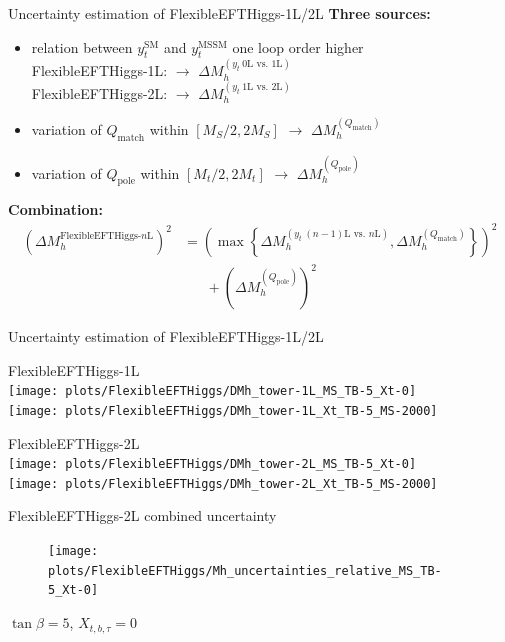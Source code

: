 \documentclass[hyperref={pdfpagelabels=false},ngerman]{beamer}
\renewcommand{\emph}{\textbf}
\newcommand{\pole}{\ensuremath{\text{pole}}}
\begin{document}
\begin{frame}{Uncertainty estimation of FlexibleEFTHiggs-1L/2L}
  \emph{Three sources:}
  \begin{itemize}
  \item relation between $y_t^{\text{SM}}$ and $y_t^{\text{MSSM}}$ one loop order higher \\
    FlexibleEFTHiggs-1L: $\rightarrow$ $\Delta M_h^{(y_t\ \text{0L vs. 1L})}$\\
    FlexibleEFTHiggs-2L: $\rightarrow$ $\Delta M_h^{(y_t\ \text{1L vs. 2L})}$
  \item variation of $Q_\text{match}$ within $[M_S/2, 2 M_S]$
    $\rightarrow$ $\Delta M_h^{(Q_\text{match})}$
  \item variation of $Q_\text{pole}$ within $[M_t/2, 2 M_t]$
    $\rightarrow$ $\Delta M_h^{(Q_\pole)}$
  \end{itemize}
  \emph{Combination:}
  \begin{align*}
    \left(\Delta M_h^{\text{FlexibleEFTHiggs-$n$L}}\right)^2
    &= \left(\max\left\{
        \Delta M_h^{(y_t\ \text{$(n-1)$L vs. $n$L})},
        \Delta M_h^{(Q_\text{match})}\right\}\right)^2 \\
    &\phantom{=\;} + \left(\Delta M_h^{(Q_\pole)}\right)^2
  \end{align*}
\end{frame}

\begin{frame}{Uncertainty estimation of FlexibleEFTHiggs-1L/2L}
  \begin{minipage}[t]{0.49\textwidth}
    \centering
    FlexibleEFTHiggs-1L \\
    \texttt{[image: plots/FlexibleEFTHiggs/DMh\_tower-1L\_MS\_TB-5\_Xt-0]}\\
    \texttt{[image: plots/FlexibleEFTHiggs/DMh\_tower-1L\_Xt\_TB-5\_MS-2000]}
  \end{minipage}\hfill
  \begin{minipage}[t]{0.49\textwidth}
    \centering
    FlexibleEFTHiggs-2L \\
    \texttt{[image: plots/FlexibleEFTHiggs/DMh\_tower-2L\_MS\_TB-5\_Xt-0]}\\
    \texttt{[image: plots/FlexibleEFTHiggs/DMh\_tower-2L\_Xt\_TB-5\_MS-2000]}
  \end{minipage}
\end{frame}

\begin{frame}{FlexibleEFTHiggs-2L combined uncertainty}
  \begin{figure}
    \centering
    \texttt{[image: plots/FlexibleEFTHiggs/Mh\_uncertainties\_relative\_MS\_TB-5\_Xt-0]}
  \end{figure}
  $\tan\beta = 5$, $X_{t,b,\tau} = 0$
\end{frame}
\end{document}

